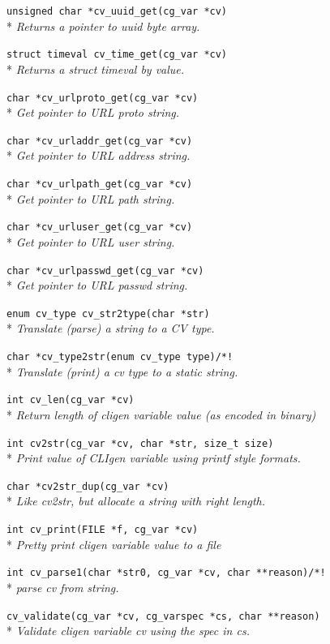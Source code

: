 \documentclass[a4paper, 10pt] {article}
\begin{document}
{{\tt unsigned char *cv\_uuid\_get(cg\_var *cv)}\\*
\emph{ Returns a pointer to uuid byte array. }

{\tt struct timeval cv\_time\_get(cg\_var *cv)}\\*
\emph{ Returns a struct timeval by value.}

{\tt char *cv\_urlproto\_get(cg\_var *cv)}\\*
\emph{  Get pointer to URL proto string. }

{\tt char *cv\_urladdr\_get(cg\_var *cv)}\\*
\emph{  Get pointer to URL address string. }

{\tt char *cv\_urlpath\_get(cg\_var *cv)}\\*
\emph{  Get pointer to URL path string. }

{\tt char *cv\_urluser\_get(cg\_var *cv)}\\*
\emph{  Get pointer to URL user string. }

{\tt char *cv\_urlpasswd\_get(cg\_var *cv)}\\*
\emph{  Get pointer to URL passwd string. }

{\tt enum cv\_type cv\_str2type(char *str)}\\*
\emph{ Translate (parse) a string to a CV type.}

{\tt char *cv\_type2str(enum cv\_type type)/*! }\\*
\emph{ Translate (print) a cv type to a static string.}

{\tt int cv\_len(cg\_var *cv)}\\*
\emph{  Return length of cligen variable value (as encoded in binary)}

{\tt int cv2str(cg\_var *cv, char *str, size\_t size)}\\*
\emph{ Print value of CLIgen variable using printf style formats.}

{\tt char *cv2str\_dup(cg\_var *cv)}\\*
\emph{ Like cv2str, but allocate a string with right length.}

{\tt int cv\_print(FILE *f, cg\_var *cv)}\\*
\emph{ Pretty print cligen variable value to a file}

{\tt int cv\_parse1(char *str0, cg\_var *cv, char **reason)/*! }\\*
\emph{ parse cv from string. }

{\tt cv\_validate(cg\_var *cv, cg\_varspec *cs, char **reason)}\\*
\emph{  Validate cligen variable cv using the spec in cs.}

}
\end{document}
